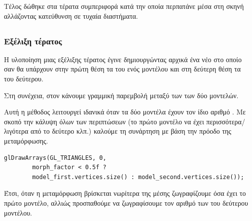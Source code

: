 \documentclass[11pt]{scrartcl} %
\begin{document}
Τέλος δώθηκε στα τέρατα συμπεριφορά κατά την οποία περπατάνε μέσα 
στη σκηνή αλλάζοντας κατεύθυνση σε τυχαία διαστήματα.


\subsection{}

\subsubsection{Εξέλιξη τέρατος}

Η υλοποίηση μιας εξέλιξης τέρατος έγινε δημιουργώντας αρχικά ένα νέο 
 στο οποίο σαν  θα υπάρχουν στην πρώτη θέση 
τα  του ενός μοντέλου και στη δεύτερη θέση τα 
 του δεύτερου. 

Στη συνέχεια, στον  κάνουμε γραμμική παρεμβολή 
μεταξύ των  των δύο μοντελών. 

Αυτή η μέθοδος λειτουργεί ιδανικά όταν τα δύο μοντέλα έχουν τον ίδιο 
αριθμό . Με σκοπό την κάλυψη όλων των περιπτώσεων 
(το πρώτο μοντέλο να έχει περισσότερα/λιγότερα  από 
το δεύτερο κλπ.) καλούμε τη συνάρτηση  με βάση την πρόοδο 
της μεταμόρφωσης.

\begin{minipage}{\textwidth}
    \begin{lstlisting}[caption=\textgreek{Κλήση συνάρτησης με βάση την πρόοδο της μεταμόρφωσης.}]
glDrawArrays(GL_TRIANGLES, 0, 
        morph_factor < 0.5f ? 
        model_first.vertices.size() : model_second.vertices.size());
\end{lstlisting}
\end{minipage}

Έτσι, όταν η μεταμόρφωση βρίσκεται νωρίτερα της μέσης ζωγραφίζουμε 
όσα  έχει το πρώτο μοντέλο, αλλιώς προσπαθούμε να ζωγραφίσουμε 
τον αριθμό των  του δεύτερου μοντέλου.

\end{document}
